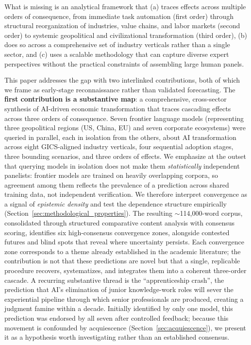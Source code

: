 \documentclass[preprint,review,12pt]{elsarticle}
\begin{document}
What is missing is an analytical framework that (a) traces effects across multiple orders of consequence, from immediate task automation (first order) through structural reorganization of industries, value chains, and labor markets (second order) to systemic geopolitical and civilizational transformation (third order), (b) does so across a comprehensive set of industry verticals rather than a single sector, and (c) uses a scalable methodology that can capture diverse expert perspectives without the practical constraints of assembling large human panels.

This paper addresses the gap with two interlinked contributions, both of which we frame as early-stage reconnaissance rather than validated forecasting. The \textbf{first contribution is a substantive map}: a comprehensive, cross-sector synthesis of AI-driven economic transformation that traces cascading effects across three orders of consequence. Seven frontier language models (representing three geopolitical regions (US, China, EU) and seven corporate ecosystems) were queried in parallel, each in isolation from the others, about AI transformation across eight GICS-aligned industry verticals, four sequential adoption stages, three bounding scenarios, and three orders of effects. We emphasize at the outset that querying models in isolation does not make them \emph{statistically} independent panelists: frontier models are trained on heavily overlapping corpora, so agreement among them reflects the prevalence of a prediction across shared training data, not independent verification. We therefore interpret convergence as a signal of \emph{epistemic density} and test the dependence structure empirically (Section~\ref{sec:methodological_properties}). The resulting ${\sim}$114,000-word corpus, consolidated through structured comparative content analysis with consensus scoring, identifies six high-consensus convergence zones, alongside contested futures and blind spots that reveal where uncertainty persists. Each convergence zone corresponds to a theme already established in the academic literature; the contribution is not that these predictions are novel but that a single, replicable procedure recovers, systematizes, and integrates them into a coherent three-order cascade. A recurring substantive thread is the ``apprenticeship crash'', the prediction that AI's elimination of junior knowledge-work roles will sever the experiential pipeline through which senior professionals are produced, creating a judgment famine within a decade. Initially identified by only one model, this prediction was endorsed by all seven after controlled feedback; because this movement is confounded by acquiescence (Section~\ref{sec:acquiescence}), we present it as a hypothesis worth investigating rather than an established consensus.
\end{document}
